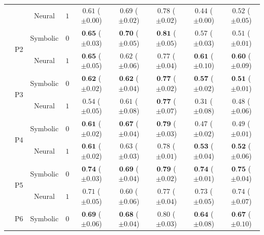 \begin{table}[!t]
\begin{tabular}{ccccccccc}
		&  & Neural & $1$ & $0.61 $ {\tiny ($\pm 0.00$)} & $0.69 $ {\tiny ($\pm 0.02$)} & $0.78 $ {\tiny ($\pm 0.02$)} & $0.44 $ {\tiny ($\pm 0.00$)} & $0.52 $ {\tiny ($\pm 0.05$)}\\
		\cmidrule{2-9}
		& \multirow{2}{*}{P2} & Symbolic & $0$ & $\textbf{0.65} $ {\tiny ($\pm 0.03$)} & $\textbf{0.70} $ {\tiny ($\pm 0.05$)} & $\textbf{0.81} $ {\tiny ($\pm 0.05$)} & $0.57 $ {\tiny ($\pm 0.03$)} & $0.51 $ {\tiny ($\pm 0.01$)}\\
		&  & Neural & $1$ & $\textbf{0.65} $ {\tiny ($\pm 0.05$)} & $0.62 $ {\tiny ($\pm 0.06$)} & $0.77 $ {\tiny ($\pm 0.04$)} & $\textbf{0.61} $ {\tiny ($\pm 0.10$)} & $\textbf{0.60} $ {\tiny ($\pm 0.09$)}\\
		\cmidrule{2-9}
		& \multirow{2}{*}{P3} & Symbolic & $0$ & $\textbf{0.62} $ {\tiny ($\pm 0.02$)} & $\textbf{0.62} $ {\tiny ($\pm 0.04$)} & $\textbf{0.77} $ {\tiny ($\pm 0.02$)} & $\textbf{0.57} $ {\tiny ($\pm 0.02$)} & $\textbf{0.51} $ {\tiny ($\pm 0.01$)}\\
		&  & Neural & $1$ & $0.54 $ {\tiny ($\pm 0.05$)} & $0.61 $ {\tiny ($\pm 0.08$)} & $\textbf{0.77} $ {\tiny ($\pm 0.07$)} & $0.31 $ {\tiny ($\pm 0.08$)} & $0.48 $ {\tiny ($\pm 0.06$)}\\
		\cmidrule{2-9}
		& \multirow{2}{*}{P4} & Symbolic & $0$ & $\textbf{0.61} $ {\tiny ($\pm 0.02$)} & $\textbf{0.67} $ {\tiny ($\pm 0.04$)} & $\textbf{0.79} $ {\tiny ($\pm 0.03$)} & $0.47 $ {\tiny ($\pm 0.02$)} & $0.49 $ {\tiny ($\pm 0.01$)}\\
		&  & Neural & $1$ & $\textbf{0.61} $ {\tiny ($\pm 0.02$)} & $0.63 $ {\tiny ($\pm 0.03$)} & $0.78 $ {\tiny ($\pm 0.01$)} & $\textbf{0.53} $ {\tiny ($\pm 0.04$)} & $\textbf{0.52} $ {\tiny ($\pm 0.06$)}\\
		\cmidrule{2-9}
		& \multirow{2}{*}{P5} & Symbolic & $0$ & $\textbf{0.74} $ {\tiny ($\pm 0.03$)} & $\textbf{0.69} $ {\tiny ($\pm 0.04$)} & $\textbf{0.79} $ {\tiny ($\pm 0.02$)} & $\textbf{0.74} $ {\tiny ($\pm 0.01$)} & $\textbf{0.75} $ {\tiny ($\pm 0.04$)}\\
		&  & Neural & $1$ & $0.71 $ {\tiny ($\pm 0.05$)} & $0.60 $ {\tiny ($\pm 0.06$)} & $0.77 $ {\tiny ($\pm 0.04$)} & $0.73 $ {\tiny ($\pm 0.05$)} & $0.74 $ {\tiny ($\pm 0.07$)}\\
		\cmidrule{2-9}
		& \multirow{2}{*}{P6} & Symbolic & $0$ & $\textbf{0.69} $ {\tiny ($\pm 0.06$)} & $\textbf{0.68} $ {\tiny ($\pm 0.04$)} & $0.80 $ {\tiny ($\pm 0.03$)} & $\textbf{0.64} $ {\tiny ($\pm 0.08$)} & $\textbf{0.67} $ {\tiny ($\pm 0.10$)}\\

\end{tabular}
\end{table}

